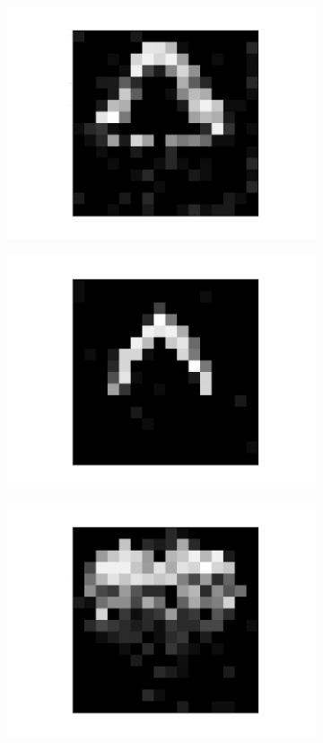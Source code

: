\begin{figure}[h!]
	\centering
	\begin{subfigure}{.25\textwidth}
  		\centering
  		\includegraphics[width=.8\linewidth]{imgs/poker/compl11.png}
  		\label{fig:sub1}
	\end{subfigure}%
	\begin{subfigure}{.25\textwidth}
  		\centering
  		\includegraphics[width=.8\linewidth]{imgs/poker/compl21.png}
  		\label{fig:sub1}
	\end{subfigure}%
	\begin{subfigure}{.25\textwidth}
  		\centering
  		\includegraphics[width=.8\linewidth]{imgs/poker/compl31.png}

\end{subfigure}
\end{figure}
